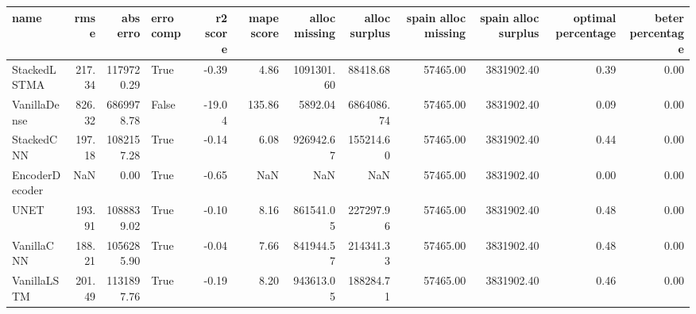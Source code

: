 \begin{tabular}{lrrlrrrrrrrr}
\toprule
name & rmse & abs erro & erro comp & r2 score & mape score & alloc missing & alloc surplus & spain alloc missing & spain alloc surplus & optimal percentage & beter percentage \\
\midrule
StackedLSTMA & 217.34 & 1179720.29 & True & -0.39 & 4.86 & 1091301.60 & 88418.68 & 57465.00 & 3831902.40 & 0.39 & 0.00 \\
VanillaDense & 826.32 & 6869978.78 & False & -19.04 & 135.86 & 5892.04 & 6864086.74 & 57465.00 & 3831902.40 & 0.09 & 0.00 \\
StackedCNN & 197.18 & 1082157.28 & True & -0.14 & 6.08 & 926942.67 & 155214.60 & 57465.00 & 3831902.40 & 0.44 & 0.00 \\
EncoderDecoder & NaN & 0.00 & True & -0.65 & NaN & NaN & NaN & 57465.00 & 3831902.40 & 0.00 & 0.00 \\
UNET & 193.91 & 1088839.02 & True & -0.10 & 8.16 & 861541.05 & 227297.96 & 57465.00 & 3831902.40 & 0.48 & 0.00 \\
VanillaCNN & 188.21 & 1056285.90 & True & -0.04 & 7.66 & 841944.57 & 214341.33 & 57465.00 & 3831902.40 & 0.48 & 0.00 \\
VanillaLSTM & 201.49 & 1131897.76 & True & -0.19 & 8.20 & 943613.05 & 188284.71 & 57465.00 & 3831902.40 & 0.46 & 0.00 \\
\bottomrule
\end{tabular}

